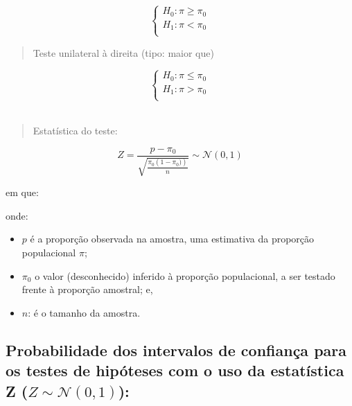 \documentclass[
]{book}
\providecommand{\tightlist}{%
  \setlength{\itemsep}{0pt}\setlength{\parskip}{0pt}}
\begin{document}
\hfill\break

\[
\begin{cases}
    H_{0}: \pi \ge \pi_{0}\\
    H_{1}: \pi < \pi_{0}\\
\end{cases}
\]

\hfill\break

\begin{quote}
Teste unilateral à direita (tipo: maior que)
\end{quote}

\hfill\break

\[
\begin{cases}
    H_{0}: \pi \le \pi_{0}\\
    H_{1}: \pi > \pi_{0}\\
\end{cases}
\]\\

\begin{quote}
Estatística do teste:
\end{quote}

\[
Z=\frac{p-\pi_{0} }{\sqrt{\frac{\pi_{0} \left(1-\pi_{0}) \right)}{n}}} \sim \mathcal{N}(0,1)
\]

\hfill\break

em que:

\hfill\break

onde:

\hfill\break

\begin{itemize}
\tightlist
\item
  \(p\) é a proporção observada na amostra, uma estimativa da proporção populacional \(\pi\);\\
\item
  \(\pi_{0}\) o valor (desconhecido) inferido à proporção populacional, a ser testado frente à proporção amostral; e,\\
\item
  \(n\): é o tamanho da amostra.
\end{itemize}

\hfill\break

\hypertarget{probabilidade-dos-intervalos-de-confianuxe7a-para-os-testes-de-hipuxf3teses-com-o-uso-da-estatuxedstica-z-z-sim-mathcaln01-1}{%
\subsection{\texorpdfstring{Probabilidade dos intervalos de confiança para os testes de hipóteses com o uso da estatística Z (\(Z \sim \mathcal{N}(0,1)\)):}{Probabilidade dos intervalos de confiança para os testes de hipóteses com o uso da estatística Z (Z \textbackslash sim \textbackslash mathcal\{N\}(0,1)):}}\label{probabilidade-dos-intervalos-de-confianuxe7a-para-os-testes-de-hipuxf3teses-com-o-uso-da-estatuxedstica-z-z-sim-mathcaln01-1}}
\end{document}
